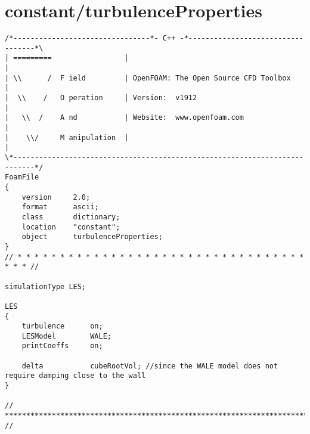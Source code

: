 \section{constant/turbulenceProperties}
\begin{lstlisting}
/*--------------------------------*- C++ -*----------------------------------*\
| =========                 |                                                 |
| \\      /  F ield         | OpenFOAM: The Open Source CFD Toolbox           |
|  \\    /   O peration     | Version:  v1912                                 |
|   \\  /    A nd           | Website:  www.openfoam.com                      |
|    \\/     M anipulation  |                                                 |
\*---------------------------------------------------------------------------*/
FoamFile
{
    version     2.0;
    format      ascii;
    class       dictionary;
    location    "constant";
    object      turbulenceProperties;
}
// * * * * * * * * * * * * * * * * * * * * * * * * * * * * * * * * * * * * * //

simulationType LES;

LES
{
	turbulence      on;
	LESModel		WALE;
	printCoeffs		on;
	
	delta           cubeRootVol; //since the WALE model does not require damping close to the wall
}

// ************************************************************************* //

\end{lstlisting}

